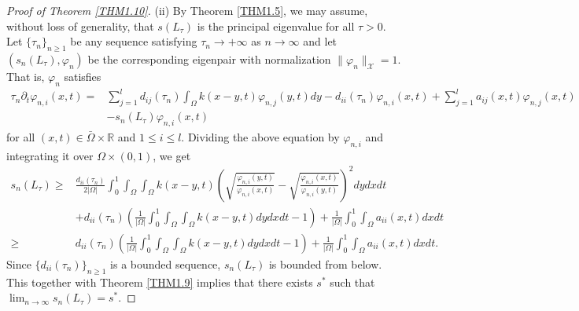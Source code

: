 \documentclass[11pt,reqno]{amsart}
\numberwithin{equation}{section}
\begin{document}
\begin{proof}[Proof of Theorem \ref{THM1.10}]
(ii) By Theorem \ref{THM1.5}, we may assume, without loss of generality, that $s(L_{\tau})$ is the principal eigenvalue for all $\tau>0$.
Let $\{\tau_{n}\}_{n\geq 1}$ be any sequence satisfying $\tau_{n} \to +\infty$ as $n\to\infty$ and let $( s_{n}(L_{\tau}), \varphi_{n})$ be the corresponding eigenpair with normalization $\| \varphi_{n} \|_{\mathcal{X}} = 1$. That is, $\varphi_{n}$ satisfies
\begin{equation}\label{3-26}
\begin{aligned}
\tau_{n} \partial_{t} \varphi_{n,i}(x,t) =& \sum_{j=1}^{l} d_{ij}(\tau_{n}) \int_{\Omega} k(x-y,t) \varphi_{n,j}(y,t)dy - d_{ii}(\tau_{n})\varphi_{n,i}(x,t) + \sum_{j=1}^{l} a_{ij}(x,t) \varphi_{n,j}(x,t) \\
&- s_{n}(L_{\tau}) \varphi_{n,i}(x,t)
\end{aligned}
\end{equation}
for all $(x,t)\in\bar{\Omega} \times \mathbb{R}$ and $1\leq i \leq l$.
Dividing the above equation by $\varphi_{n,i}$ and integrating it over $\Omega \times (0,1)$, we get
\begin{align*} s_{n}(L_{\tau}) \geq& \frac{d_{ii}(\tau_{n})}{2|\Omega|} \int_{0}^{1}\int_{\Omega} \int_{\Omega}  k(x-y,t) \left( \sqrt{\frac{ \varphi_{n,i}(y,t) }{ \varphi_{n,i}(x,t)}} - \sqrt{\frac{ \varphi_{n,i}(x,t) }{ \varphi_{n,i}(y,t) } } \right)^{2}dydxdt
\\
&+ d_{ii}(\tau_{n}) \left( \frac{1}{|\Omega|} \int_{0}^{1} \int_{\Omega} \int_{\Omega} k(x-y,t)dydxdt - 1 \right) + \frac{1}{|\Omega|} \int_{0}^{1} \int_{\Omega} a_{ii}(x,t) dx dt
\\
\geq& d_{ii}(\tau_{n}) \left( \frac{1}{|\Omega|} \int_{0}^{1} \int_{\Omega} \int_{\Omega} k(x-y,t)dydxdt - 1 \right) + \frac{1}{|\Omega|} \int_{0}^{1} \int_{\Omega} a_{ii}(x,t) dx dt.
\end{align*}
Since $ \{d_{ii}(\tau_{n})\}_{n\geq 1}$ is a bounded sequence,
$s_{n}(L_{\tau})$ is bounded from below. This together with Theorem \ref{THM1.9} implies that there exists $s^{*}$ such that
$\lim_{n \to \infty} s_{n}(L_{\tau}) = s^{*}.$


\end{proof}
\end{document}
